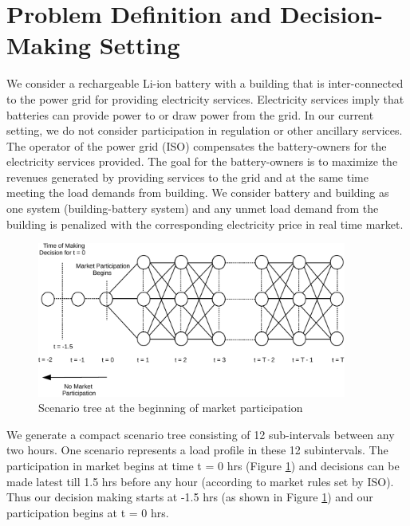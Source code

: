 \documentclass[11pt,twoside]{article}
\begin{document}
\section{Problem Definition and Decision-Making Setting}\label{sec:setting}
We consider a rechargeable Li-ion battery with a building that is inter-connected to the power grid for providing electricity services. Electricity services imply that batteries can provide power to or draw power from the grid. In our current setting, we do not consider participation in regulation or other ancillary services. The operator of the power grid (ISO) compensates the battery-owners for the electricity services provided. The goal for the battery-owners is to maximize the revenues generated by providing services to the grid and at the same time meeting the load demands from building. We consider battery and building as one system (building-battery system) and any unmet load demand from the building is penalized with the corresponding electricity price in real time market.\\
\begin{figure}[h!]
\begin{center}
\includegraphics[width=4in]{Figures/scenario_tree-crop.pdf} \caption{Scenario tree at the beginning of market participation}\label{fig:scenario_tree}\end{center}
\end{figure}
We generate a compact scenario tree consisting of 12 sub-intervals between any two hours. One scenario represents a load profile in these 12 subintervals. The participation in market begins at time t = 0 hrs (Figure \ref{fig:scenario_tree}) and decisions can be made latest till 1.5 hrs before any hour (according to market rules set by ISO). Thus our decision making starts at -1.5 hrs (as shown in Figure \ref{fig:scenario_tree}) and our participation begins at t = 0 hrs.   
\end{document}
